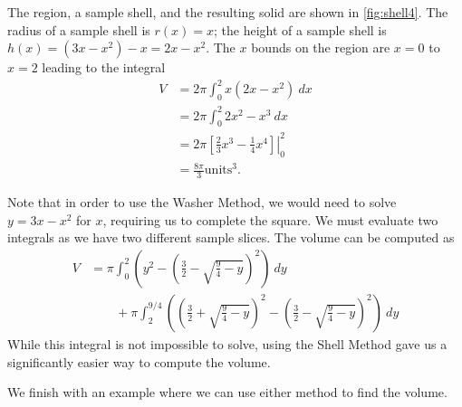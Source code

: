 {The region, a sample shell, and the resulting solid are shown in \autoref{fig:shell4}. The radius of a sample shell is $r(x)=x$; the height of a sample shell is $h(x)=(3x-x^2)-x=2x-x^2$. The $x$ bounds on the region are $x=0$ to $x=2$ leading to the integral
\begin{align*}
V&=2\pi \int_0^2 x(2x-x^2) \ dx\\
&=2\pi \int_0^2 2x^2-x^3 \ dx\\
&=2\pi \left.\left[ \frac23 x^3-\frac14 x^4 \right] \right|_0^2\\
&=\frac{8\pi}{3} \text{units}^3.
\end{align*}

Note that in order to use the Washer Method, we would need to solve $y=3x-x^2$ for $x$, requiring us to complete the square. We must evaluate two integrals as we have two different sample slices. The volume can be computed as 
\begin{align*}
V&=\pi\int_0^2\left(y^2-\left(\frac32-\sqrt{\frac94 -y}\right)^2\right)\ dy \\
&\qquad+\pi\int_2^{9/4}\left(\left(\frac32+\sqrt{\frac94 -y}\right)^2
-\left(\frac32-\sqrt{\frac94 -y}\right)^2\right)\ dy
\end{align*}
While this integral is not impossible to solve, using the Shell Method gave us a significantly easier way to compute the volume.}

We finish with an example where we can use either method to find the volume.

